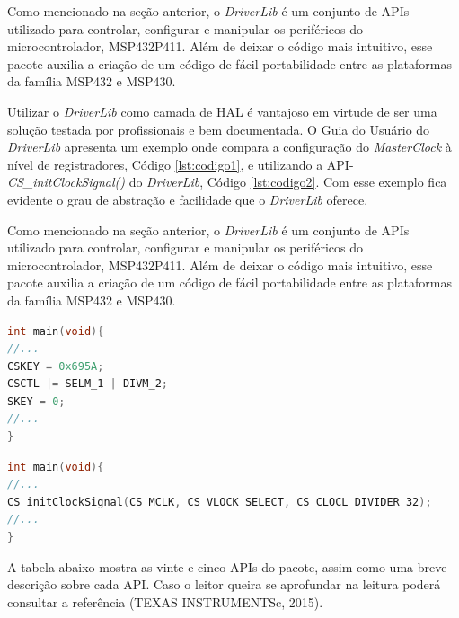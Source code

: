 Como mencionado na seção anterior, o \textit{DriverLib} é um conjunto de APIs utilizado para controlar, configurar e manipular os periféricos do microcontrolador, MSP432P411. Além de deixar o código mais intuitivo, esse pacote auxilia a criação de um código de fácil portabilidade entre as plataformas da família MSP432 e MSP430.

Utilizar o \textit{DriverLib} como camada de HAL é vantajoso em virtude de ser uma solução testada por profissionais e bem documentada. O Guia do Usuário do \textit{DriverLib} apresenta um exemplo onde compara a configuração do \textit{MasterClock} à nível de registradores, Código \ref{lst:codigo1}, e utilizando a API-\textit{CS\_initClockSignal()} do \textit{DriverLib}, Código \ref{lst:codigo2}. Com esse exemplo fica evidente o grau de abstração e facilidade que o \textit{DriverLib} oferece.

Como mencionado na seção anterior, o \textit{DriverLib} é um conjunto de APIs utilizado para controlar, configurar e manipular os periféricos do microcontrolador, MSP432P411. Além de deixar o código mais intuitivo, esse pacote auxilia a criação de um código de fácil portabilidade entre as plataformas da família MSP432 e MSP430.


%
\renewcommand{\lstlistingname}{Código}
\begin{lstlisting}[caption={Configurando o MasterClock a nível de registrador},label={lst:codigo1},language=C]
int main(void){
//...
CSKEY = 0x695A;
CSCTL |= SELM_1 | DIVM_2;
SKEY = 0;
//...
}
\end{lstlisting}

\begin{lstlisting}[caption={Configurando o MasterClock com a API do DriverLib},label={lst:codigo2},language=C]
int main(void){
//...
CS_initClockSignal(CS_MCLK, CS_VLOCK_SELECT, CS_CLOCL_DIVIDER_32);
//...
}
\end{lstlisting}

A tabela abaixo mostra as vinte e cinco APIs do pacote, assim como  uma breve descrição sobre cada API. Caso o leitor queira se aprofundar na leitura poderá consultar a referência (TEXAS INSTRUMENTSc, 2015). 

